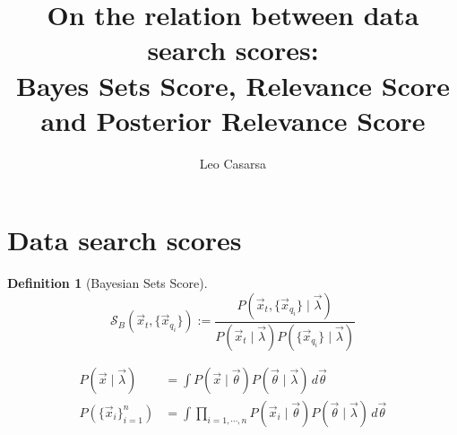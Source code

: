 \documentclass{article}
\newcommand{\set}[1]{\{{#1}\}}
\theoremstyle{break}
\newtheorem{definition}{Definition}[section]
\begin{document}
\title{On the relation between data search scores: \\
  Bayes Sets Score, Relevance Score and Posterior Relevance Score}
\author{Leo Casarsa}
\maketitle

\section{Data search scores}

  \newcommand{\mS}{\mathcal{S}}
  \newcommand{\target}{\vec x_t}
  \newcommand{\targetone}{\vec x_a}
  \newcommand{\targettwo}{\vec x_b}
  \newcommand{\queryset}{\set{\vec x_{q_i}}}
  \newcommand{\reals}{\mathbb{R}}
  \newcommand{\Rd}{\mathbb{R}^d}
  \newcommand{\Rdn}{\mathbb{R}^{d \times n}}
  \newcommand{\Rpos}{\mathbb{R}_{\geq 0}}
  \newcommand{\Rdr}{\mathbb{R}^{d \times m}}
  \newcommand{\mD}{\mathcal{D}}
  \newcommand{\mG}{\mathcal{G}}
  \newcommand{\hypers}{\vec \lambda}
  \newcommand{\params}{\vec \theta}
  \newcommand{\yt}{y_t}
  \newcommand{\yi}{y_i}
  \newcommand{\sameyq}{y_{q_1}=\ldots=y_{q_n}}
  \newcommand{\yqset}{y_q^{\star}}
  \newcommand{\rscore}{\mS_{\mG, R}}
  \newcommand{\rscoretq}{\rscore(\target, \queryset)}
  \newcommand{\pscore}{\mS_{\mG, P}}
  \newcommand{\pscoretq}{\pscore(\target, \queryset)}
  \newcommand{\sstats}{\text{T}}
  \newcommand{\crp}{\textsc{CRP}}
  \newcommand{\into}{\rightarrow}

  
    \begin{definition}[Bayesian Sets Score]
      
      \begin{equation}
        \mS_B(\target, \queryset) :=
            \frac {P(\target, \queryset \mid \hypers)}
                {P(\target \mid \hypers) {P(\queryset \mid \hypers)}}
      \end{equation}
      
      \begin{align*}
        P(\vec x \mid \hypers) &= \int P(\vec x \mid \params)
            P(\params \mid \hypers) \, d\params \\
        P(\set{\vec x_i}_{i=1}^n) &= \int \prod_{i=1, \cdots, n} 
            P(\vec x_i \mid \params) P(\params \mid \hypers) \, d\params
      \end{align*}

    \end{definition}
\end{document}
